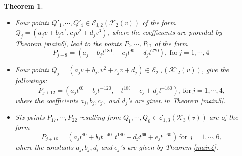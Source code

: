 \documentclass[11pt]{amsart}
\newcommand{\Ee}{{\mathcal E}}
\newcommand{\KK}{{\mathcal K}}
\newtheorem{thm}{Theorem}[section]
\numberwithin{equation}{section}
\numberwithin{table}{section}
\newcommand\<{\langle}
\begin{document}
\begin{thm}
\begin{itemize}
				\item[(4)] Four points     $Q'_1, \cdots, Q'_4 \in \Ee_{3, 2}(\KK_2(v))$  of the form
				$Q_j=(  a_j v +b_j v^2 ,     c_j v^2 + d_j v^3 )$,
				where the coefficients are	 provided by Theorem  \ref{main6}, lead  to the points
				$P_9, \cdots, P_{12}$ of the form
			$$P_{j+8}= (  a_j  +b_j t^{180}, \quad    c_j t^{90} + d_j t^{270}), \  \text{for} \ j=1,\cdots, 4. $$
			
				

			
				\item[(5)] Four points   $Q_j=(a_j v+ b_j, v^2 + c_j v + d_j )\in \Ee_{2, 2}(\KK'_2(v))$,   give the followings:
				$$P_{j+12} = \left( a_j t^{60} + b_j t^{-120}, \quad t^{180} + c_j + d_j t^{-180} \right), \  \text{for} \ j=1,\cdots, 4,$$
				where the coefficients $a_j, b_j, c_j,$ and $d_j$'s are given in Theorem  \ref{main5}.
				 
				 
				 
				\item[(6)] Six points  $P_{17}, \cdots, P_{22}$  resulting from $Q_1, \cdots, Q_6 \in \Ee_{1, 3}(\KK_3(v))$ are of the   form
				$$P_{j+16}= \left(  a_j t^{80} + b_j  t^{-40},
		 t^{180} + d_j t^{60} + e_j t^{-60} \right)  \ \text{for } j=1,\cdots, 6,$$
			where the constants $a_j, b_j,  d_j$ and $ e_j$'s are given by Theorem \ref{main4}.
 

\end{itemize}
\end{thm}
\end{document}
